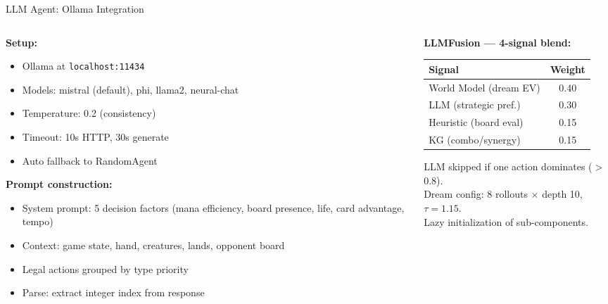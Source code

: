 \documentclass[aspectratio=169, 10pt]{beamer}
\begin{document}
\begin{frame}{LLM Agent: Ollama Integration}
  \begin{columns}[T]
    \begin{column}{0.52\textwidth}
      \footnotesize
      \textbf{Setup:}
      \begin{itemize}\scriptsize
        \item Ollama at \texttt{localhost:11434}
        \item Models: mistral (default), phi, llama2, neural-chat
        \item Temperature: 0.2 (consistency)
        \item Timeout: 10s HTTP, 30s generate
        \item Auto fallback to RandomAgent
      \end{itemize}
      \vspace{0.2cm}
      \textbf{Prompt construction:}
      \begin{itemize}\scriptsize
        \item System prompt: 5 decision factors (mana efficiency, board presence, life, card advantage, tempo)
        \item Context: game state, hand, creatures, lands, opponent board
        \item Legal actions grouped by type priority
        \item Parse: extract integer index from response
      \end{itemize}
    \end{column}
    \begin{column}{0.45\textwidth}
      \footnotesize
      \textbf{LLMFusion --- 4-signal blend:}
      \vspace{0.2cm}
      \begin{center}
      \begin{tabular}{@{}lc@{}}
        \toprule
        \textbf{Signal} & \textbf{Weight} \\
        \midrule
        World Model (dream EV) & 0.40 \\
        LLM (strategic pref.)  & 0.30 \\
        Heuristic (board eval)  & 0.15 \\
        KG (combo/synergy)      & 0.15 \\
        \bottomrule
      \end{tabular}
      \end{center}
      \vspace{0.2cm}
      \scriptsize
      LLM skipped if one action dominates ($>$0.8).\\
      Dream config: 8 rollouts $\times$ depth 10, $\tau = 1.15$.\\
      Lazy initialization of sub-components.
    \end{column}
  \end{columns}
\end{frame}
\end{document}
